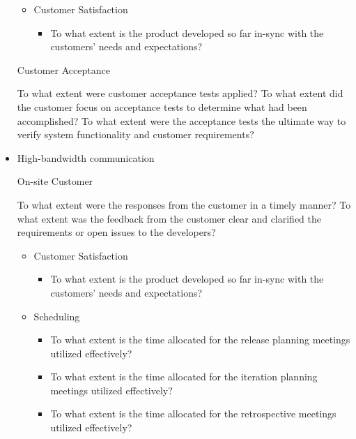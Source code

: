 \begin{appendices}
\begin{itemize}
\begin{itemize}
\begin{itemize}
				\end{itemize}
		\end{itemize}
		\begin{itemize}
			\item Customer Satisfaction
				\begin{itemize}
					\item To what extent is the product developed so far in-sync with the customers' needs and expectations?
				\end{itemize}
		\end{itemize}
		\begin{itemize}
			\addition Customer Acceptance
				\begin{itemize}
					\addition To what extent were customer acceptance tests applied?
					\addition To what extent did the customer focus on acceptance tests to determine what had been accomplished?
					\addition To what extent were the acceptance tests the ultimate way to verify system functionality and customer requirements?
				\end{itemize}
		\end{itemize}
	\item High-bandwidth communication
		\begin{itemize}
			\addition On-site Customer
				\begin{itemize}
					\addition To what extent were the responses from the customer in a timely manner?
					\addition To what extent was the feedback from the customer clear and clarified the requirements or open issues to the developers?
				\end{itemize}
		\end{itemize}
		\begin{itemize}
			\item Customer Satisfaction
				\begin{itemize}
					\item To what extent is the product developed so far in-sync with the customers' needs and expectations?
				\end{itemize}
			\item Scheduling
				\begin{itemize}
					\item To what extent is the time allocated for the release planning meetings utilized effectively? 
					\item To what extent is the time allocated for the iteration planning meetings utilized effectively?
					\item To what extent is the time allocated for the retrospective meetings utilized effectively? 

\end{itemize}
\end{itemize}
\end{itemize}
\end{appendices}
